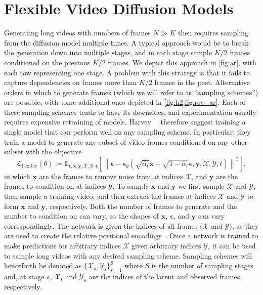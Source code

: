 \section{Flexible Video Diffusion Models}
Generating long videos with numbers of frames $N \gg K$ then requires sampling from the diffusion model multiple times. A typical approach would be to break the generation down into multiple stages, and in each stage sample $K/2$ frames conditioned on the previous $K/2$ frames. 
We depict this approach in \cref{fig:ar}, with each row representing one stage. A problem with this strategy is that it fails to capture dependencies on frames more than $K/2$ frames in the past. 
Alternative orders in which to generate frames (which we will refer to as ``sampling schemes'') are possible, with some additional ones depicted in \cref{fig:h2,fig:rev_ar}. Each of these sampling schemes tends to have its downsides, and experimentation usually requires expensive retraining of models. 
Harvey~\etal~\cite{fdm} therefore suggest training a single model that can perform well on any sampling scheme. In particular, they train a model to generate any subset of video frames conditioned on any other subset with the objective
\begin{equation}
    \mathcal{L}_{\text {flexible}}(\theta):=\mathbb{E}_{t, \mathbf{x}, \mathbf{y}, \mathcal{X}, \mathcal{Y}, \boldsymbol{\epsilon}}\left[\left\|\boldsymbol{\epsilon}-\boldsymbol{\epsilon}_\theta\left(\sqrt{\bar{\alpha}_t} \mathbf{x}+\sqrt{1-\bar{\alpha}_t} \boldsymbol{\epsilon}, \mathbf{y}, \mathcal{X}, \mathcal{Y}, t\right)\right\|^2\right],
    \label{eq:lflexible}
\end{equation}
in which $\mathbf{x}$ are the frames to remove noise from at indices $\mathcal{X}$, and $\mathbf{y}$ are the frames to condition on at indices $\mathcal{Y}$. 
To sample $\mathbf{x}$ and $\mathbf{y}$ we first sample $\mathcal{X}$ and $\mathcal{Y}$, then sample a training video, and then extract the frames at indices $\mathcal{X}$ and $\mathcal{Y}$ to form $\mathbf{x}$ and $\mathbf{y}$, respectively.
Both the number of frames to generate and the number to condition on can vary, so the shapes of $\mathbf{x}$, $\boldsymbol{\epsilon}$, and $\mathbf{y}$ can vary correspondingly. The network is given the indices of all frames ($\mathcal{X}$ and $\mathcal{Y}$), as they are used to create the relative positional encodings~\cite{rpe1, rpe2}. 
Once a network is trained to make predictions for arbitrary indices $\mathcal{X}$ given arbitrary indices $\mathcal{Y}$, it can be used to sample long videos with any desired sampling scheme. Sampling schemes will henceforth be denoted as $\{\mathcal{X}_s, \mathcal{Y}_s\}_{s=1}^S$ where $S$ is the number of sampling stages and, at stage $s$, $\mathcal{X}_s$ and $\mathcal{Y}_s$ are the indices of the latent and observed frames, respectively. 


